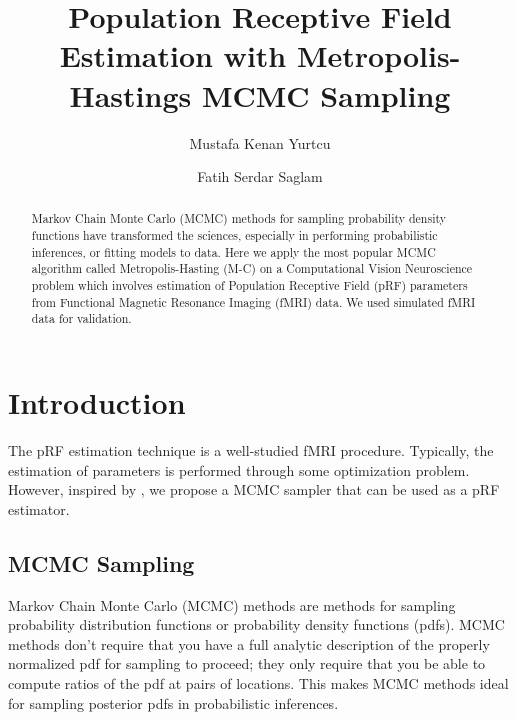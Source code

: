 \documentclass[review]{elsarticle}
\begin{document}
\begin{frontmatter}

\title{Population Receptive Field Estimation with Metropolis-Hastings MCMC Sampling}

\author{Mustafa Kenan Yurtcu}
\author{Fatih Serdar Saglam}


\begin{abstract}
Markov Chain Monte Carlo (MCMC) methods for sampling probability density functions have transformed the sciences, especially in performing probabilistic inferences, or fitting models to data. Here we apply the most popular MCMC algorithm called Metropolis-Hasting (M-C) on a Computational Vision Neuroscience problem which involves estimation of Population Receptive Field (pRF) parameters from Functional Magnetic Resonance Imaging (fMRI) data. We used simulated fMRI data for validation. 
\end{abstract}

\end{frontmatter}


\section{Introduction}
The pRF estimation technique is a well-studied fMRI procedure. Typically, the estimation of parameters is performed through some optimization problem. However, inspired by \cite{Adaszewski2018}, we propose a MCMC sampler that can be used as a pRF estimator.
\subsection{MCMC Sampling}
Markov Chain Monte Carlo (MCMC) methods are methods for sampling probability distribution functions or probability density functions (pdfs). MCMC methods don’t require that you have a full analytic description of the properly normalized pdf for sampling to proceed; they only require that you be able to compute
ratios of the pdf at pairs of locations. This makes MCMC methods ideal for sampling
posterior pdfs in probabilistic inferences.
\end{document}
